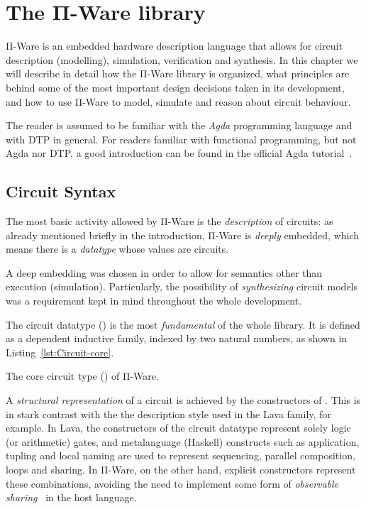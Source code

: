 \chapter{The Π-Ware library}
\label{chap:piware}

    Π-Ware is an embedded hardware description language that allows
    for circuit description (modelling), simulation, verification and synthesis.
    In this chapter we will describe in detail how the Π-Ware library is organized,
    what principles are behind some of the most important design decisions taken in its development,
    and how to use Π-Ware to model, simulate and reason about circuit behaviour.

    The reader is assumed to be familiar with the \emph{Agda} programming language
    and with \acl{DTP} in general.
    For readers familiar with functional programming, but not Agda nor \ac{DTP},
    a good introduction can be found in the official Agda tutorial~\cite{agda-tutorial-norell}.

    \section{Circuit Syntax}
    \label{sec:circuit-syntax}
        The most basic activity allowed by Π-Ware is the \emph{description} of circuits:
        as already mentioned briefly in the introduction, Π-Ware is \emph{deeply} embedded,
        which means there is a \emph{datatype} whose values are circuits.

        A deep embedding was chosen in order to allow for semantics other than execution (simulation).
        Particularly, the possibility of \emph{synthesizing} circuit models was a requirement
        kept in mind throughout the whole development.

        The circuit datatype () is the most \emph{fundamental} of the whole library.
        It is defined as a dependent inductive family, indexed by two natural numbers,
        as shown in Listing~\ref{lst:Circuit-core}.

        \begin{listing}[h]
            \caption{The core circuit type () of Π-Ware. \label{lst:Circuit-core}}
        \end{listing}

        A \emph{structural representation} of a circuit is achieved by the constructors of .
        This is in stark contrast with the the description style used in the Lava family, for example.
        In Lava, the constructors of the circuit datatype represent solely logic (or arithmetic) gates,
        and metalanguage (Haskell) constructs such as application, tupling and local naming are
        used to represent sequencing, parallel composition, loops and sharing.
        In Π-Ware, on the other hand, explicit constructors represent these combinations,
        avoiding the need to implement some form of
        \emph{observable sharing}~\cite{gill-typesafe-observable-sharing} in the host language.

